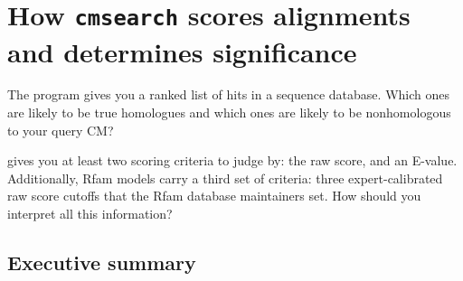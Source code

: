 \section{How \texttt{cmsearch} scores alignments and determines significance}

The  program gives you a ranked list of hits in a
sequence database.  Which ones are likely to be true homologues and
which ones are likely to be nonhomologous to your query CM?

 gives you at least two scoring criteria to judge
by: the  raw score, and an E-value. Additionally,
Rfam models carry a third set of criteria: three expert-calibrated raw
score cutoffs that the Rfam database maintainers set. How should you
interpret all this information?
\subsection{Executive summary}

